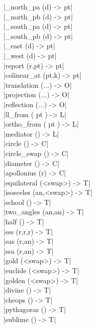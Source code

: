 \documentclass[DIV         = 14,
               fontsize    = 10,
               index       = totoc,
               twoside,
               cadre,
               headings    = small
               ]{tkz-doc}
\begin{document}
\begin{multicols}{3}
|_north_pa (d)             -> pt|  \\
|_north_pb (d)             -> pt|  \\               
|_south_pa (d)             -> pt|  \\
|_south_pb (d)             -> pt|  \\                  
|_east (d)                 -> pt|  \\
|_west (d)                 -> pt|  \\
|report (r,pt)             -> pt|  \\
|colinear_at (pt,k)        -> pt|  \\                 
|translation (...)         -> O|   \\
|projection (...)          -> O|   \\
|reflection (...)          -> O|   \\
|ll_from ( pt )            -> L|   \\
|ortho_from ( pt )         -> L|   \\
|mediator ()               -> L|   \\
|circle ()                 -> C|   \\
|circle_swap ()            -> C|   \\
|diameter ()               -> C|   \\
|apollonius (r)            -> C|   \\                     
|equilateral (<swap>)      -> T|   \\
|isosceles (an,<swap>)     -> T|   \\
|school ()                 -> T|   \\
|two_angles (an,an)        -> T|   \\
|half ()                   -> T|   \\
|sss (r,r,r)               -> T|   \\
|sas (r,an)                -> T|   \\
|ssa (r,an)                -> T|   \\
|gold (<swap>)             -> T|   \\
|euclide (<swap>)          -> T|   \\
|golden (<swap>)           -> T|   \\
|divine ()                 -> T|   \\
|cheops ()                 -> T|   \\
|pythagoras ()             -> T|   \\
|sublime  ()               -> T|   \\

\end{multicols}
\end{document}
